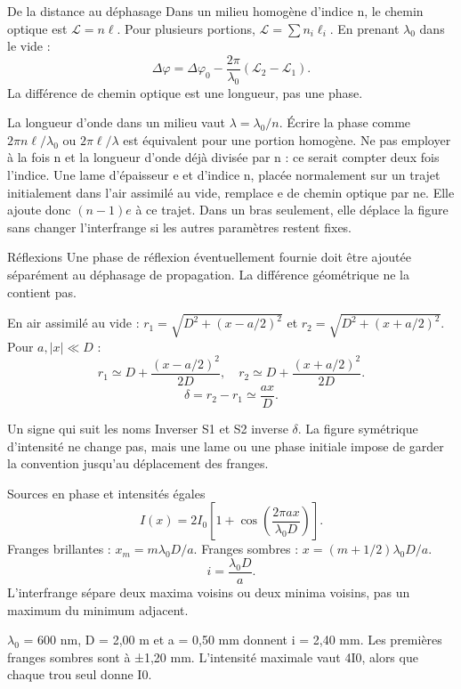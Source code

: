\begin{loi}{De la distance au déphasage}
Dans un milieu homogène d’indice n, le chemin optique est $\mathcal L=n\ell$. Pour plusieurs portions, $\mathcal L=\sum n_i\ell_i$. En prenant $\lambda_0$ dans le vide :\[\Delta\varphi=\Delta\varphi_0-\frac{2\pi}{\lambda_0}(\mathcal L_2-\mathcal L_1).\]La différence de chemin optique est une longueur, pas une phase.
\end{loi}
La longueur d’onde dans un milieu vaut $\lambda=\lambda_0/n$. Écrire la phase comme $2\pi n\ell/\lambda_0$ ou $2\pi\ell/\lambda$ est équivalent pour une portion homogène. Ne pas employer à la fois n et la longueur d’onde déjà divisée par n : ce serait compter deux fois l’indice.
Une lame d’épaisseur e et d’indice n, placée normalement sur un trajet initialement dans l’air assimilé au vide, remplace e de chemin optique par ne. Elle ajoute donc $(n-1)e$ à ce trajet. Dans un bras seulement, elle déplace la figure sans changer l’interfrange si les autres paramètres restent fixes.
\begin{methode}{Réflexions}
Une phase de réflexion éventuellement fournie doit être ajoutée séparément au déphasage de propagation. La différence géométrique ne la contient pas.
\end{methode}


En air assimilé au vide : $r_1=\sqrt{D^2+(x-a/2)^2}$ et $r_2=\sqrt{D^2+(x+a/2)^2}$. Pour $a,|x|\ll D$ :\[r_1\simeq D+\frac{(x-a/2)^2}{2D},\quad r_2\simeq D+\frac{(x+a/2)^2}{2D}.\]\[\delta=r_2-r_1\simeq\frac{ax}{D}.\]
\begin{piege}{Un signe qui suit les noms}
Inverser S1 et S2 inverse \ensuremath{\delta}. La figure symétrique d’intensité ne change pas, mais une lame ou une phase initiale impose de garder la convention jusqu’au déplacement des franges.
\end{piege}


\begin{loi}{Sources en phase et intensités égales}
\[I(x)=2I_0\left[1+\cos\left(\frac{2\pi ax}{\lambda_0D}\right)\right].\]Franges brillantes : $x_m=m\lambda_0D/a$. Franges sombres : $x=(m+1/2)\lambda_0D/a$.\[i=\frac{\lambda_0D}{a}.\]L’interfrange sépare deux maxima voisins ou deux minima voisins, pas un maximum du minimum adjacent.
\end{loi}
\ensuremath{\lambda_0} = 600 nm, D = 2,00 m et a = 0,50 mm donnent i = 2,40 mm. Les premières franges sombres sont à ±1,20 mm. L’intensité maximale vaut 4I0, alors que chaque trou seul donne I0.



